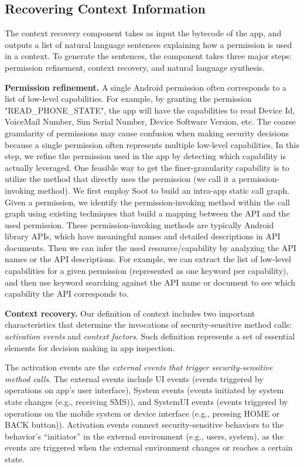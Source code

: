 \subsection{Recovering Context Information}
The context recovery component takes as input the bytecode of the app, and outputs a list of natural language sentences explaining how a permission is used in a context. To generate the sentences, the component takes three major steps: permission refinement, context recovery, and natural language synthesis.

\textbf{Permission refinement.}
A single Android permission often corresponds to a list of low-level capabilities. For example, by granting the permission "READ\_PHONE\_STATE", the app will have the capabilities to read Device Id, VoiceMail Number, Sim Serial Number, Device Software Version, etc. 
The coarse granularity of permissions may cause confusion when making security decisions because a single permission often represents multiple low-level capabilities. 
In this step, we refine the permission used in the app by detecting which capability is actually leveraged. 
One feasible way to get the finer-granularity capability is to utilize the method that directly uses the permission (we call it a  permission-invoking method). We first employ Soot\cite{fritz2013highly} to build an intra-app static call graph. 
Given a permission, we identify the permission-invoking method within the call graph using existing techniques \cite{au2012pscout} that build a mapping between the API and the used permission. 
These permission-invoking methods are typically Android library APIs, which have meaningful names and detailed descriptions in API documents. 
Then we can infer the used resource/capability by analyzing the API names or the API descriptions. 
For example, we can extract the list of low-level capabilities for a given permission (represented as one keyword per capability), and then use keyword searching against the API name or document to see which capability the API corresponds to.

\textbf{Context recovery.}
Our definition of context includes two important characteristics that determine the invocations of security-sensitive method calls: \textit{activation events} and \textit{context factors}.
Such definition represents a set of essential elements for decision making in app inspection.

The activation events are the \textit{external events that trigger security-sensitive method calls}. 
The external events include UI events (events triggered by operations on app's user interface), System events (events initiated by system state changes (e.g., receiving SMS)), and SystemUI events (events triggered by operations on the mobile system or device interface (e.g., pressing HOME or BACK button)).
Activation events connect security-sensitive behaviors to the behavior's ``initiator'' in the external environment (e.g., users, system), as the events are triggered when the external environment changes or reaches a certain state.


